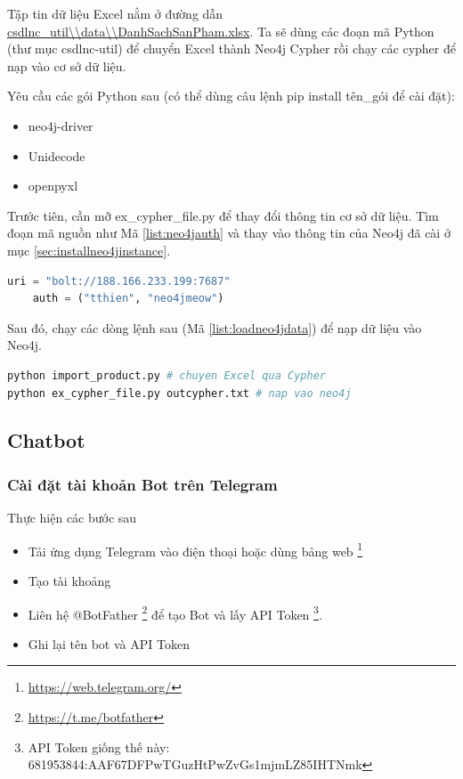 Tập tin dữ liệu Excel nằm ở đường dẫn \url{csdlnc_util\\data\\DanhSachSanPham.xlsx}. Ta sẽ dùng các đoạn mã Python (thư mục csdlnc-util) để chuyển Excel thành Neo4j Cypher rồi chạy các cypher để nạp vào cơ sở dữ liệu. 

Yêu cầu các gói Python sau (có thể dùng câu lệnh pip install tên\_gói để cài đặt): 

\begin{itemize}
\item neo4j-driver
\item Unidecode 
\item openpyxl
\end{itemize}

Trước tiên, cần mỡ ex\_cypher\_file.py để thay đổi thông tin cơ sở dữ liệu. Tìm đoạn mã nguồn như Mã \ref{list:neo4jauth} và thay vào thông tin của Neo4j đã cài ở mục \ref{sec:installneo4jinstance}.

\begin{lstlisting}[language=python,caption={Thông tin Neo4j},label={list:neo4jauth}]
    uri = "bolt://188.166.233.199:7687"
    auth = ("tthien", "neo4jmeow")
\end{lstlisting}

Sau đó, chạy các dòng lệnh sau (Mã \ref{list:loadneo4jdata}) để nạp dữ liệu vào Neo4j.

\begin{lstlisting}[language=bash,caption={Cài Neo4j},label={list:loadneo4jdata}]
python import_product.py # chuyen Excel qua Cypher
python ex_cypher_file.py outcypher.txt # nap vao neo4j 
\end{lstlisting}

\subsection{Chatbot}
\subsubsection{Cài đặt tài khoản Bot trên Telegram}
Thực hiện các bước sau
\begin{itemize}
\item Tải ứng dụng Telegram vào điện thoại hoặc dùng bảng web \footnote{\url{https://web.telegram.org/}}
\item Tạo tài khoảng 
\item Liên hệ @BotFather \footnote{\url{https://t.me/botfather}} để tạo Bot và lấy API Token \footnote{API Token giống thế này: 681953844:AAF67DFPwTGuzHtPwZvGs1mjmLZ85IHTNmk}. 
\item Ghi lại tên bot và API Token 
\end{itemize}

